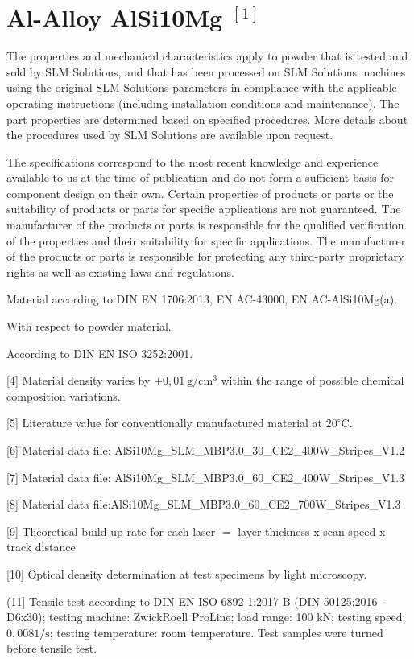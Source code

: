 \documentclass[10pt]{article}
\begin{document}
\section*{Al-Alloy AlSi10Mg ${ }^{[1]}$}
The properties and mechanical characteristics apply to powder that is tested and sold by SLM Solutions, and that has been processed on SLM Solutions machines using the original SLM Solutions parameters in compliance with the applicable operating instructions (including installation conditions and maintenance). The part properties are determined based on specified procedures. More details about the procedures used by SLM Solutions are available upon request.

The specifications correspond to the most recent knowledge and experience available to us at the time of publication and do not form a sufficient basis for component design on their own. Certain properties of products or parts or the suitability of products or parts for specific applications are not guaranteed. The manufacturer of the products or parts is responsible for the qualified verification of the properties and their suitability for specific applications. The manufacturer of the products or parts is responsible for protecting any third-party proprietary rights as well as existing laws and regulations.

Material according to DIN EN 1706:2013, EN AC-43000, EN AC-AlSi10Mg(a).

With respect to powder material.

According to DIN EN ISO 3252:2001.

[4] Material density varies by $\pm 0,01 \mathrm{~g} / \mathrm{cm}^{3}$ within the range of possible chemical composition variations.

[5] Literature value for conventionally manufactured material at $20^{\circ} \mathrm{C}$.

[6] Material data file: AlSi10Mg\_SLM\_MBP3.0\_30\_CE2\_400W\_Stripes\_V1.2

[7] Material data file: AlSi10Mg\_SLM\_MBP3.0\_60\_CE2\_400W\_Stripes\_V1.3

[8] Material data file:AlSi10Mg\_SLM\_MBP3.0\_60\_CE2\_700W\_Stripes\_V1.3

[9] Theoretical build-up rate for each laser $=$ layer thickness $\mathrm{x}$ scan speed $\mathrm{x}$ track distance

[10] Optical density determination at test specimens by light microscopy.

(11] Tensile test according to DIN EN ISO 6892-1:2017 B (DIN 50125:2016 - D6x30); testing machine: ZwickRoell ProLine; load range: 100 kN; testing speed: $0,0081 / \mathrm{s}$; testing temperature: room temperature. Test samples were turned before tensile test.
\end{document}

